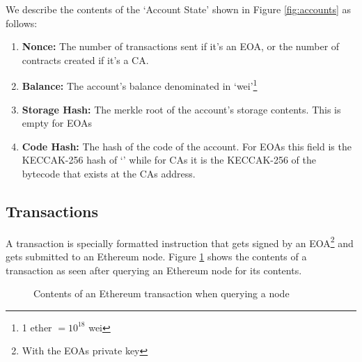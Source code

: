 We describe the contents of the `Account State' shown in Figure \ref{fig:accounts} as follows:
\begin{enumerate}
    \item \textbf{Nonce:} The number of transactions sent if it's an EOA, or the number of contracts created if it's a CA.
    \item \textbf{Balance:} The account's balance denominated in `wei'\footnote{1 ether $= 10^{18}$ wei }
    \item \textbf{Storage Hash:} The merkle root of the account's storage contents. This is empty for EOAs
    \item \textbf{Code Hash:} The hash of the code of the account. For EOAs this field is the KECCAK-256 hash of `' while for CAs it is the KECCAK-256 of the bytecode that exists at the CAs address.
\end{enumerate}

\subsection{Transactions} \label{transactions}
A transaction is specially formatted instruction that gets signed by an EOA\footnote{With the EOAs private key} and gets submitted to an Ethereum node. Figure \ref{fig:transaction} shows the contents of a transaction as seen after querying an Ethereum node for its contents.



\begin{figure}[H]
    \centering
    
    \caption{Contents of an Ethereum transaction when querying a node}
    \label{fig:transaction}
\end{figure}

